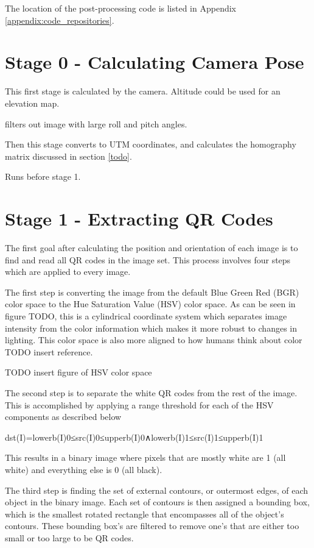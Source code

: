 The location of the post-processing code is listed in Appendix \ref{appendix:code_repositories}.

\section{Stage 0 - Calculating Camera Pose}
\label{processing-stage0}

This first stage is calculated by the camera. Altitude could be used for an elevation map. 

filters out image with large roll and pitch angles.

Then this stage converts to UTM coordinates,   and calculates the homography matrix discussed in section \ref{todo}.

Runs before stage 1. 

\section{Stage 1 - Extracting QR Codes}
\label{processing-stage1}

The first goal after calculating the position and orientation of each image is to find and read all QR codes in the image set.  This process involves four steps which are applied to every image.

The first step is converting the image from the default Blue Green Red (BGR) color space to the Hue Saturation Value (HSV) color space.  As can be seen in figure TODO, this is a cylindrical coordinate system which separates image intensity from the color information which makes it more robust to changes in lighting. This color space is also more aligned to how humans think about color TODO insert reference.

TODO insert figure of HSV color space

The second step is to separate the white QR codes from the rest of the image.  This is accomplished by applying a range threshold for each of the HSV components as described below

dst(I)=lowerb(I)0≤src(I)0≤upperb(I)0∧lowerb(I)1≤src(I)1≤upperb(I)1 

This results in a binary image where pixels that are mostly white are 1 (all white) and everything else is 0 (all black).

The third step is finding the set of external contours, or outermost edges, of each object in the binary image.  Each set of contours is then assigned a bounding box, which is the smallest rotated rectangle that encompasses all of the object's contours.  These bounding box's are filtered to remove one's that are either too small or too large to be QR codes. 

